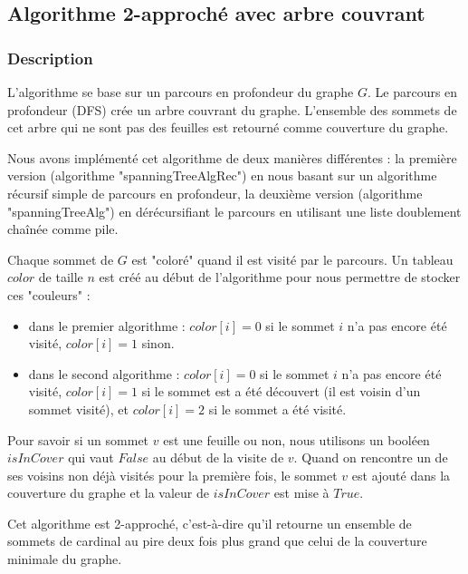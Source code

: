 \documentclass[a4paper,10pt]{article}
\begin{document}

\subsection{Algorithme 2-approché avec arbre couvrant}

\subsubsection{Description}

L'algorithme se base sur un parcours en profondeur du graphe $G$. Le parcours en profondeur (DFS) crée un arbre couvrant du graphe. L'ensemble des sommets de cet arbre qui ne sont pas des feuilles est retourné comme couverture du graphe.

Nous avons implémenté cet algorithme de deux manières différentes : la première version (algorithme "spanningTreeAlgRec") en nous basant sur un algorithme récursif simple de parcours en profondeur, la deuxième version (algorithme "spanningTreeAlg") en dérécursifiant le parcours en utilisant une liste doublement chaînée comme pile.

Chaque sommet de $G$ est "coloré" quand il est visité par le parcours. Un tableau $color$ de taille $n$ est créé au début de l'algorithme pour nous permettre de stocker ces "couleurs" : 

\begin{itemize}
\item dans le premier algorithme : $color[i] = 0$ si le sommet $i$ n'a pas encore été visité, $color[i] = 1$ sinon.
\item dans le second algorithme : $color[i] = 0$ si le sommet $i$ n'a pas encore été visité, $color[i] = 1$ si le sommet est a été découvert (il est voisin d'un sommet visité), et $color[i] = 2$ si le sommet a été visité.
\end{itemize}



Pour savoir si un sommet $v$ est une feuille ou non, nous utilisons un booléen $isInCover$ qui vaut $False$ au début de la visite de $v$. Quand on rencontre un de ses voisins non déjà visités pour la première fois, le sommet $v$ est ajouté dans la couverture du graphe et la valeur de $isInCover$ est mise à $True$.

Cet algorithme est 2-approché, c'est-à-dire qu'il retourne un ensemble de sommets de cardinal au pire deux fois plus grand que celui de la couverture minimale du graphe.
\end{document}
